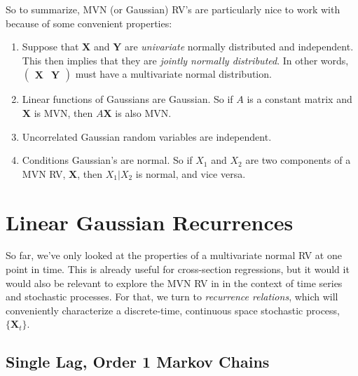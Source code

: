 \documentclass[a4paper,12pt]{scrartcl}
\begin{document}
So to summarize, MVN (or Gaussian) RV's are particularly nice to work with because
of some convenient properties:
\begin{enumerate}
    \item Suppose that $\mathbf{X}$ and $\mathbf{Y}$ are \emph{univariate}
	normally distributed and independent. This then implies that they are 
	\emph{jointly normally distributed}. In other words, 
	$\begin{pmatrix} \mathbf{X} & \mathbf{Y} \end{pmatrix}$ must have a multivariate
	normal distribution. 
    \item Linear functions of Gaussians are Gaussian. So if $A$
	is a constant matrix and $\mathbf{X}$ is MVN, then $A\mathbf{X}$
	is also MVN.
    \item Uncorrelated Gaussian random variables are independent.
    \item Conditions Gaussian's are normal. So if $X_1$ and $X_2$
	are two components of a MVN RV, $\mathbf{X}$, then 
	$X_1 | X_2$ is normal, and vice versa.
\end{enumerate}

\newpage 
\section{Linear Gaussian Recurrences}

So far, we've only looked at the properties of a multivariate
normal RV at one point in time. This is already useful for 
cross-section regressions, but it would 
it would also be relevant to explore
the MVN RV in in the context of time series and stochastic 
processes. For that, we turn
to \emph{recurrence relations}, which will conveniently characterize
a discrete-time, continuous space stochastic process, 
$\{\mathbf{X}_t\}$.

\subsection{Single Lag, Order 1 Markov Chains}
\end{document}
